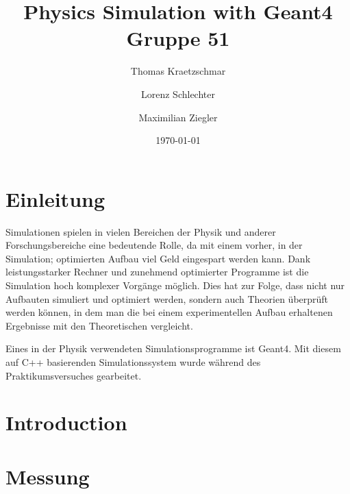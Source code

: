 \documentclass[a4paper,11pt,twoside]{article}
\title{%
{\Huge Physics Simulation with Geant4}\\[0.5\baselineskip]
{\normalsize Gruppe 51}
}
\author{%
Thomas Kraetzschmar
\and Lorenz Schlechter
\and Maximilian Ziegler
}
\date{\today}
\begin{document}
\pagestyle{fancy}
\maketitle
\clearpage
\tableofcontents
\clearpage
\pagestyle{fancy}
\section{Einleitung}
Simulationen spielen in vielen Bereichen der Physik und anderer Forschungsbereiche eine bedeutende Rolle, da mit einem vorher, in der Simulation; optimierten Aufbau viel Geld eingespart werden kann. Dank leistungsstarker Rechner und zunehmend optimierter Programme ist die Simulation hoch komplexer Vorgänge möglich. Dies hat zur Folge, dass nicht nur Aufbauten simuliert und optimiert werden, sondern auch Theorien überprüft werden können, in dem man die bei einem experimentellen Aufbau erhaltenen Ergebnisse mit den Theoretischen vergleicht.

Eines in der Physik verwendeten Simulationsprogramme ist Geant4. Mit diesem auf C++ basierenden Simulationssystem wurde während des Praktikumsversuches gearbeitet.

\section{Introduction}

\section{Messung}
\end{document}
